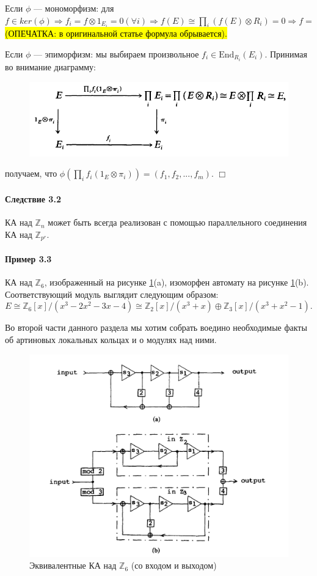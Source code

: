 \documentclass[a4paper,12pt]{article}
\newcommand{\Endom}{\text{End}}
\begin{document}
Если $\phi$ --- мономорфизм: для $f \in ker(\phi) \Rightarrow f_i = f \otimes 1_{E_i} = 0 (\forall i) \Rightarrow f(E) \cong \prod_{i}(f(E) \otimes R_i) = 0 \Rightarrow f = $ \hl{(ОПЕЧАТКА: в оригинальной статье формула обрывается).}

Если $\phi$ --- эпиморфизм: мы выбираем произвольное $f_i \in \Endom_{R_i} (E_i)$. Принимая во внимание диаграмму:

\begin{figure}[h]
	\centering
	\includegraphics[width=0.5\linewidth]{pictures/diag_2.png}
\end{figure}

получаем, что $\phi(\prod_i f_i (1_E \otimes \pi_i)) = (f_1, f_2, ..., f_m)$. $\Box$

\paragraph{Следствие 3.2}
КА над $\mathbb{Z}_n$ может быть всегда реализован с помощью параллельного соединения КА над $\mathbb{Z}_{p^r}$.


\paragraph{Пример 3.3}
КА над $\mathbb{Z}_6$, изображенный на рисунке \ref{fig2ab}(a), изоморфен автомату на рисунке \ref{fig2ab}(b). Соответствующий модуль выглядит следующим образом:
$$
E \cong \mathbb{Z}_6 [x] / (x^3 - 2x^2 - 3x - 4) \cong \mathbb{Z}_2 [x] / (x^3 + x) \oplus \mathbb{Z}_3 [x] / (x^3 + x^2 - 1).
$$

Во второй части данного раздела мы хотим собрать воедино необходимые факты об артиновых локальных кольцах и о модулях над ними.

\begin{figure}[h]
	\centering
	\includegraphics[width=0.75\linewidth]{pictures/fig2ab.png}
	\caption{Эквивалентные КА над $\mathbb{Z}_6$ (со входом и выходом)}
	\label{fig2ab}
\end{figure}
\end{document}
